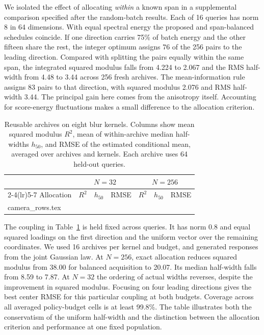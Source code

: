 We isolated the effect of allocating \emph{within} a known span in a supplemental comparison specified after the random-batch results. Each of 16 queries has norm 8 in 64 dimensions. With equal spectral energy the proposed and span-balanced schedules coincide. If one direction carries 75\% of batch energy and the other fifteen share the rest, the integer optimum assigns 76 of the 256 pairs to the leading direction. Compared with splitting the pairs equally within the same span, the integrated squared modulus falls from 4.224 to 2.067 and the RMS half-width from 4.48 to 3.44 across 256 fresh archives. The mean-information rule assigns 83 pairs to that direction, with squared modulus 2.076 and RMS half-width 3.44. The principal gain here comes from the anisotropy itself. Accounting for score-energy fluctuations makes a small difference to the allocation criterion.

\begin{table}[htbp]
\centering
\caption{Reusable archives on eight blur kernels. Columns show mean squared modulus $R^2$, mean of within-archive median half-widths $h_{50}$, and RMSE of the estimated conditional mean, averaged over archives and kernels. Each archive uses 64 held-out queries.}
\begin{tabular}{lrrrrrr}
\toprule
&\multicolumn{3}{c}{$N=32$}&\multicolumn{3}{c}{$N=256$}\\
\cmidrule(lr){2-4}\cmidrule(lr){5-7}
Allocation & $R^2$ & $h_{50}$ & RMSE & $R^2$ & $h_{50}$ & RMSE\\
\midrule
{} camera_rows.tex
\bottomrule
\end{tabular}\label{tab:finitecamera}
\end{table}
The coupling in Table~\ref{tab:finitecamera} is held fixed across queries. It has norm 0.8 and equal squared loadings on the first direction and the uniform vector over the remaining coordinates. We used 16 archives per kernel and budget, and generated responses from the joint Gaussian law. At $N=256$, exact allocation reduces squared modulus from 38.00 for balanced acquisition to 20.07. Its median half-width falls from 8.59 to 7.87. At $N=32$ the ordering of actual widths reverses, despite the improvement in squared modulus. Focusing on four leading directions gives the best center RMSE for this particular coupling at both budgets. Coverage across all averaged policy-budget cells is at least 99.8\%. The table illustrates both the conservatism of the uniform half-width and the distinction between the allocation criterion and performance at one fixed population.

